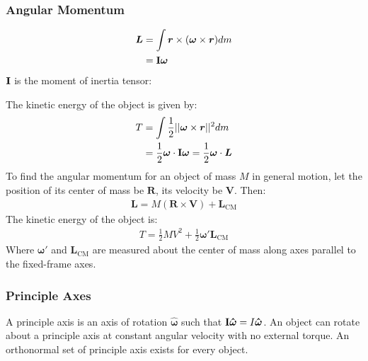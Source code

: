 \documentclass[a4paper]{article}
\newcommand{\ve}[1]{
  \ensuremath{\bm{#1}}}	               %
\newcommand{\uve}[1]{
  \ensuremath{\bm{\hat{#1}}}}          %
\newcommand{\tensor}[1]{
  \ensuremath{\text{\bf{#1}}}}         %
\begin{document}
\begin{multicols*}{2}
\subsubsection{Angular Momentum}
\begin{align*}
  \ve{L} &= \int \ve{r} \times (\ve{\omega} \times \ve{r}) dm \\
  &= \tensor{I} \ve{\omega}
\end{align*}
$\tensor{I}$ is the moment of inertia tensor:
\vspace*{-0.7em}
\begin{center}
\end{center}
The kinetic energy of the object is given by:
\begin{align*}
  T &= \int\frac{1}{2} ||\ve{\omega} \times \ve{r}||^2 dm \\
  &= \frac{1}{2} \ve{\omega} \cdot \tensor{I}\ve{\omega} = \frac{1}{2} \ve{\omega} \cdot \ve{L}
\end{align*}
To find the angular momentum for an object of mass $M$ in general motion, let
the position of its center of mass be $\ve{R}$, its velocity be $\ve{V}$. Then:
\begin{align*}
  \ve{L} = M(\ve{R} \times \ve{V}) + \ve{L}_{\text{CM}}
\end{align*}
The kinetic energy of the object is:
\begin{align*}
  T = \frac{1}{2}MV^2 + \frac{1}{2}\ve{\omega}' \ve{L}_{\text{CM}}
\end{align*}
Where $\ve{\omega}'$ and $\ve{L}_{\text{CM}}$ are measured about the center of
mass along axes parallel to the fixed-frame axes.
\subsubsection{Principle Axes}
A principle axis is an axis of rotation $\uve{\omega}$ such that
$\tensor{I}\uve{\omega} = I\uve{\omega}$. An object can rotate about a principle
axis at constant angular velocity with no external torque. An orthonormal set of
principle axis exists for every object.

\end{multicols*}
\end{document}

